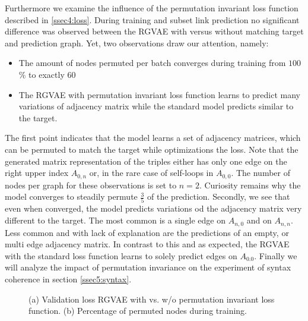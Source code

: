 Furthermore we examine the influence of the permutation invariant loss function described in \ref{ssec4:loss}. During training and subset link prediction no significant difference was observed between the RGVAE with versus without matching target and prediction graph. Yet, two observations draw our attention, namely:

\begin{itemize}
  \item The amount of nodes permuted per batch converges during training from $100$\% to exactly $60$%
  \item The RGVAE with permutation invariant loss function learns to predict many variations of adjacency matrix while the standard model predicts similar to the target.
\end{itemize}

The first point indicates that the model learns a set of adjacency matrices, which can be permuted to match the target while optimizations the loss. Note that the generated matrix representation of the triples either has only one edge on the right upper index $A_{0,n}$ or, in the rare case of self-loops in $A_{0,0}$. The number of nodes per graph for these observations is set to $n=2$. Curiosity remains why the model converges to steadily permute $\frac{3}{5}$ of the prediction.
Secondly, we see that even when converged, the model predicts variations od the adjacency matrix very different to the target. The most common is a single edge on $A_{n,0}$ and on $A_{n,n}$. Less common and with lack of explanation are the predictions of an empty, or multi edge adjacency matrix. In contrast to this and as expected, the RGVAE with the standard loss function learns to solely predict edges on $A_{0.0}$. 
Finally we will analyze the impact of permutation invariance on the experiment of syntax coherence in section \ref{ssec5:syntax}.





\begin{figure}
  \caption{(a) Validation loss RGVAE with vs. w/o permutation invariant loss function. (b) Percentage of permuted nodes during training.}
  \label{fig5:permInv}
\end{figure}

